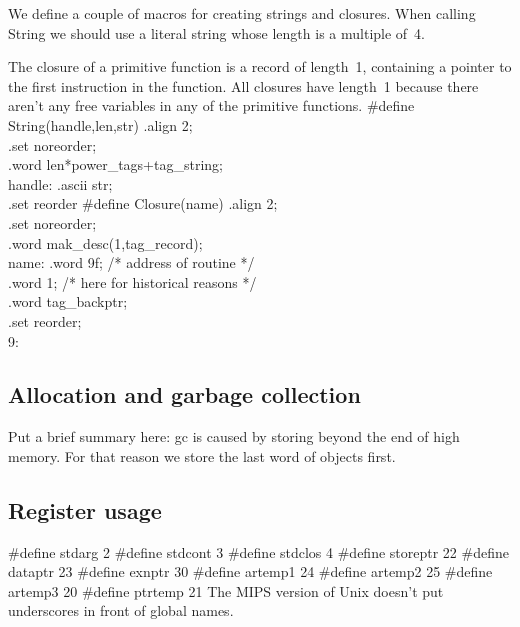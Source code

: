 \endcode
{}
We define a couple of macros for creating strings and closures.
When calling \code{}String\edoc{} we should use a literal string whose length 
is a multiple of~4.

The closure of a primitive function
 is a record of length~1, containing a pointer to the first 
instruction in the function.
All closures have length~1 because there aren't any free variables in any 
of the primitive functions.
\enddocs
{}
\endmoddef
#define String(handle,len,str) .align 2;\\
                               .set noreorder;\\
                               .word len*power_tags+tag_string;\\
                               handle: .ascii str;\\
                               .set reorder
#define Closure(name) .align    2;\\
                      .set noreorder;\\
                      .word     mak_desc(1,tag_record);\\
                      name:     .word 9f; /* address of routine */ \\
                      .word     1; /* here for historical reasons */\\
                      .word     tag_backptr;\\
                      .set reorder;\\
                      9:
\endcode
{}
\subsection{Allocation and garbage collection}
Put a brief summary here: gc is caused by storing beyond the end of high 
memory.
For that reason we store the last word of objects first.

\enddocs
{}
\subsection{Register usage}

\enddocs
{}
\endmoddef
#define stdarg 2
#define stdcont 3
#define stdclos 4
#define storeptr 22
#define dataptr 23
#define exnptr 30
#define artemp1 24
#define artemp2 25
#define artemp3 20
#define ptrtemp 21
\endcode
{}
The MIPS version of Unix doesn't put underscores in front of global names.

